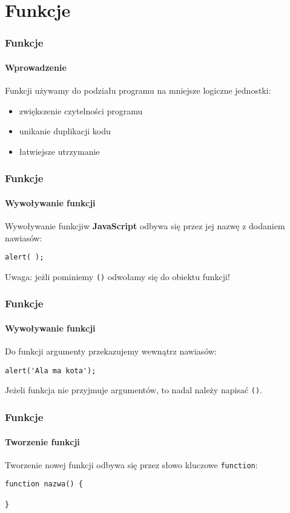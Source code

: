 \section{Funkcje}

\begin{frame}[fragile]
  \frametitle{Funkcje}
  \framesubtitle{Wprowadzenie}

  Funkcji używamy do podziału programu na mniejsze logiczne jednostki:

  \begin{itemize}
    \item zwiększenie czytelności programu
    \item unikanie duplikacji kodu
    \item łatwiejsze utrzymanie
  \end{itemize}

\end{frame}


\begin{frame}[fragile]
  \frametitle{Funkcje}
  \framesubtitle{Wywoływanie funkcji}

  Wywoływanie funkcjiw \textbf{JavaScript} odbywa się przez jej nazwę z dodaniem nawiasów:

  \begin{verbatim}
alert( );
  \end{verbatim}

  Uwaga: jeżli pominiemy \verb|()| odwołamy się do obiektu funkcji!

\end{frame}


\begin{frame}[fragile]
  \frametitle{Funkcje}
  \framesubtitle{Wywoływanie funkcji}

  Do funkcji argumenty przekazujemy wewnątrz nawiasów:

  \begin{verbatim}
alert('Ala ma kota');
  \end{verbatim}

  Jeżeli funkcja nie przyjmuje argumentów, to nadal należy napisać \verb|()|.

\end{frame}


\begin{frame}[fragile]
  \frametitle{Funkcje}
  \framesubtitle{Tworzenie funkcji}

  Tworzenie nowej funkcji odbywa się przez słowo kluczowe \verb|function|:

  \begin{verbatim}
function nazwa() {

}
  \end{verbatim}

\end{frame}


